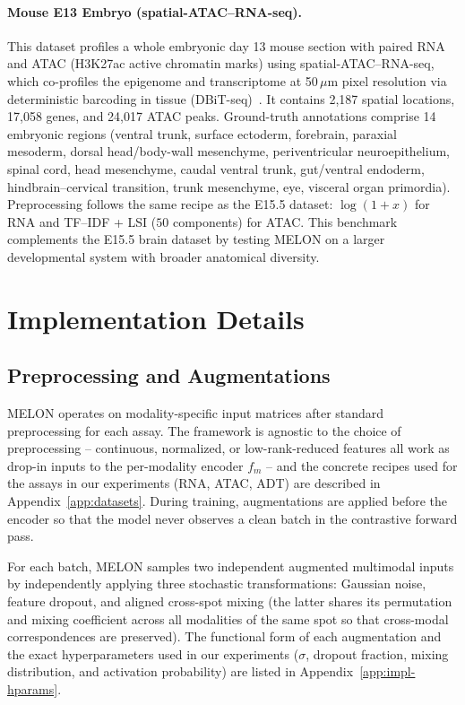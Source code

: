 \documentclass{article}
\theoremstyle{plain}
\theoremstyle{definition}
\begin{document}
\paragraph{Mouse E13 Embryo (spatial-ATAC--RNA-seq).}
This dataset profiles a whole embryonic day 13 mouse section with paired RNA and ATAC (H3K27ac active chromatin marks) using spatial-ATAC--RNA-seq, which co-profiles the epigenome and transcriptome at 50\,$\mu$m pixel resolution via deterministic barcoding in tissue (DBiT-seq)~\cite{zhang2023spatial}. It contains 2{,}187 spatial locations, 17{,}058 genes, and 24{,}017 ATAC peaks. Ground-truth annotations comprise 14 embryonic regions (ventral trunk, surface ectoderm, forebrain, paraxial mesoderm, dorsal head/body-wall mesenchyme, periventricular neuroepithelium, spinal cord, head mesenchyme, caudal ventral trunk, gut/ventral endoderm, hindbrain--cervical transition, trunk mesenchyme, eye, visceral organ primordia). Preprocessing follows the same recipe as the E15.5 dataset: $\log(1+x)$ for RNA and TF--IDF + LSI ($50$ components) for ATAC. This benchmark complements the E15.5 brain dataset by testing MELON on a larger developmental system with broader anatomical diversity.

\section{Implementation Details}\label{app:impl}

\subsection{Preprocessing and Augmentations}\label{app:impl-aug}

MELON operates on modality-specific input matrices after standard preprocessing for each assay. The framework is agnostic to the choice of preprocessing -- continuous, normalized, or low-rank-reduced features all work as drop-in inputs to the per-modality encoder $f_m$ -- and the concrete recipes used for the assays in our experiments (RNA, ATAC, ADT) are described in Appendix~\ref{app:datasets}. During training, augmentations are applied before the encoder so that the model never observes a clean batch in the contrastive forward pass.

For each batch, MELON samples two independent augmented multimodal inputs by independently applying three stochastic transformations: Gaussian noise, feature dropout, and aligned cross-spot mixing (the latter shares its permutation and mixing coefficient across all modalities of the same spot so that cross-modal correspondences are preserved). The functional form of each augmentation and the exact hyperparameters used in our experiments ($\sigma$, dropout fraction, mixing distribution, and activation probability) are listed in Appendix~\ref{app:impl-hparams}.
\end{document}
